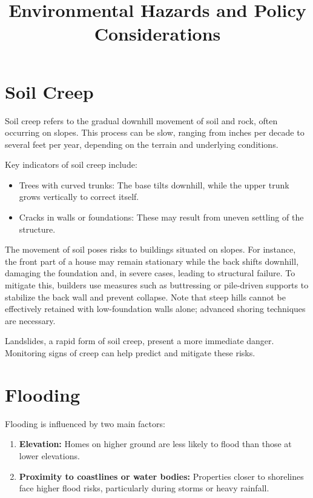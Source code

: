 \documentclass[12pt]{article}
\begin{document}
\title{Environmental Hazards and Policy Considerations}
\author{}
\date{}
\maketitle

\section{Soil Creep}
Soil creep refers to the gradual downhill movement of soil and rock, often occurring on slopes. This process can be slow, ranging from inches per decade to several feet per year, depending on the terrain and underlying conditions.

Key indicators of soil creep include:
\begin{itemize}
    \item Trees with curved trunks: The base tilts downhill, while the upper trunk grows vertically to correct itself.
    \item Cracks in walls or foundations: These may result from uneven settling of the structure.
\end{itemize}

The movement of soil poses risks to buildings situated on slopes. For instance, the front part of a house may remain stationary while the back shifts downhill, damaging the foundation and, in severe cases, leading to structural failure. To mitigate this, builders use measures such as buttressing or pile-driven supports to stabilize the back wall and prevent collapse. Note that steep hills cannot be effectively retained with low-foundation walls alone; advanced shoring techniques are necessary.

Landslides, a rapid form of soil creep, present a more immediate danger. Monitoring signs of creep can help predict and mitigate these risks.

\section{Flooding}
Flooding is influenced by two main factors:
\begin{enumerate}
    \item \textbf{Elevation:} Homes on higher ground are less likely to flood than those at lower elevations.
    \item \textbf{Proximity to coastlines or water bodies:} Properties closer to shorelines face higher flood risks, particularly during storms or heavy rainfall.
\end{enumerate}
\end{document}

